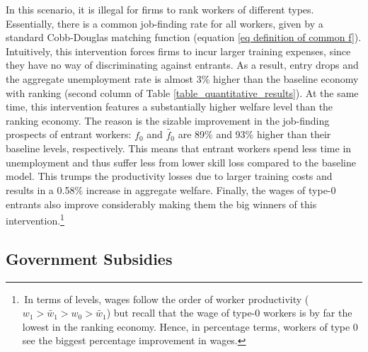 \documentclass[12pt]{article} %
\theoremstyle{definition}
\begin{document}
In this scenario, it is illegal for firms to rank workers of different types.
Essentially, there is a common job-finding rate for all workers, given by a standard Cobb-Douglas matching function (equation \ref{eq definition of common f}).
Intuitively, this intervention forces firms to incur larger training expenses, since they have no way of discriminating against entrants. 
As a result, entry drops and the aggregate unemployment rate is almost 3\% higher than the baseline economy with ranking (second column of Table \ref{table_quantitative_results}).
At the same time, this intervention features a substantially higher welfare level than the ranking economy. 
The reason is the sizable improvement in the job-finding prospects of entrant workers: $f_{0}$ and $\tilde{f_{0}}$ are 89\% and 93\% higher than their baseline levels, respectively.
This means that entrant workers spend less time in unemployment and thus suffer less from lower skill loss compared to the baseline model.
This trumps the productivity losses due to larger training costs and results in a 0.58\% increase in aggregate welfare.
Finally, the wages of type-0 entrants also improve considerably making them the big winners of this intervention.\footnote{\,In terms of levels, wages follow the order of worker productivity ($w_{1} > \tilde{w_{1}} > w_{0} > \tilde{w_{1}}$) but recall that the wage of type-0 workers is by far the lowest in the ranking economy. Hence, in percentage terms, workers of type 0 see the biggest percentage improvement in wages.}


\subsection{Government Subsidies} \label{section government subsidies quant}
\end{document}
